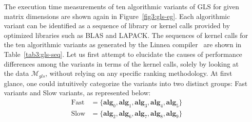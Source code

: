 \documentclass[acmsmall,screen, review]{acmart}
\begin{document}
The execution time measurements of ten algorithmic variants of GLS for given matrix dimensions are shown again in Figure~\ref{fig3:gls-eg}. Each algorithmic variant can be identified as a sequence of library or kernel calls provided by optimized libraries such as BLAS and LAPACK. The sequences of kernel calls for the ten algorithmic variants as generated by the Linnea compiler~\cite{barthels2021linnea} are shown in Table~\ref{tab3:gls-seq}.
Let us first attempt to elucidate the causes of performance differences among the variants in terms of the kernel calls, solely by looking at the data $\mathcal{M}_{gls}$, without relying on any specific ranking methodology. At first glance, one could intuitively categorize the variants into two distinct groups: Fast variants  and Slow variants, as represented  below:
\begin{equation}
\label{eq3:gls-gt}
\begin{aligned}
\text{Fast} &= \{\mathbf{alg}_0, \mathbf{alg}_1, \mathbf{alg}_3, \mathbf{alg}_4, \mathbf{alg}_5\} \\
\text{Slow} &= \{\mathbf{alg}_2, \mathbf{alg}_6, \mathbf{alg}_7, \mathbf{alg}_8, \mathbf{alg}_9\}
\end{aligned}
\end{equation}

%
%
%
\end{document}
